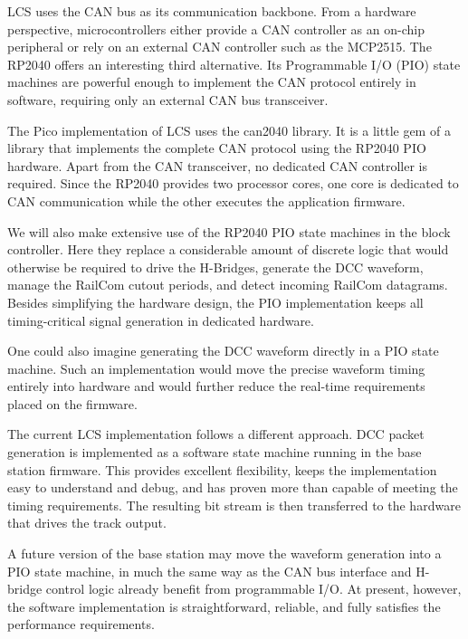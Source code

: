 
LCS uses the CAN bus as its communication backbone. From a hardware perspective,
microcontrollers either provide a CAN controller as an on-chip peripheral or 
rely on an external CAN controller such as the MCP2515. The RP2040 offers an 
interesting third alternative. Its Programmable I/O (PIO) state machines are 
powerful enough to implement the CAN protocol entirely in software, requiring 
only an external CAN bus transceiver.

The Pico implementation of LCS uses the can2040 library. It is a little gem 
of a library that implements the complete CAN protocol using the RP2040 PIO 
hardware. Apart from the CAN transceiver, no dedicated CAN controller is 
required. Since the RP2040 provides two processor cores, one core is dedicated 
to CAN communication while the other executes the application firmware.


We will also make extensive use of the RP2040 PIO state machines in the block 
controller. Here they replace a considerable amount of discrete logic that 
would otherwise be required to drive the H-Bridges, generate the DCC waveform, 
manage the RailCom cutout periods, and detect incoming RailCom datagrams. 
Besides simplifying the hardware design, the PIO implementation keeps all 
timing-critical signal generation in dedicated hardware.


One could also imagine generating the DCC waveform directly in a PIO state 
machine. Such an implementation would move the precise waveform timing entirely 
into hardware and would further reduce the real-time requirements placed on 
the firmware.

The current LCS implementation follows a different approach. 
DCC packet generation is implemented as a software state machine running in 
the base station firmware. This provides excellent flexibility, keeps the 
implementation easy to understand and debug, and has proven more than capable 
of meeting the timing requirements. The resulting bit stream is then 
transferred to the hardware that drives the track output.

A future version of the base station may move the waveform generation into 
a PIO state machine, in much the same way as the CAN bus interface and H-bridge 
control logic already benefit from programmable I/O. At present, however, 
the software implementation is straightforward, reliable, and fully satisfies 
the performance requirements.

